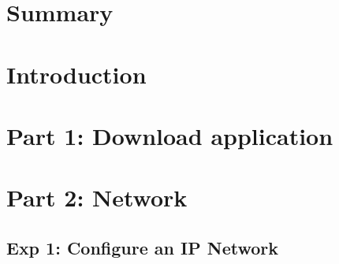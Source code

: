 \documentclass[compilation.tex]{subfiles}
\begin{document}
\section{Summary}
\label{sec:summary}

\section{Introduction}
\label{sec:introduction}

\section{Part 1: Download application}
\label{sec:downloadapp}

\section{Part 2: Network}
\label{sec:network}

\subsection{Exp 1: Configure an IP Network}
\label{exp:1}

\end{document}
